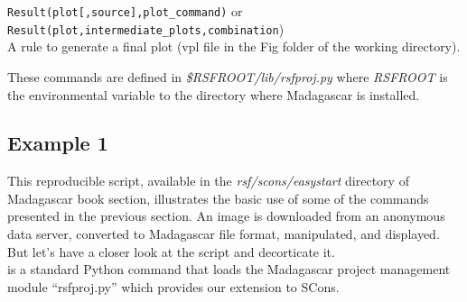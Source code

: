 \noindent\texttt{Result(plot[,source],plot\_command)} or\\ 
\texttt{Result(plot,intermediate\_plots,combination})\\
\indent A rule to generate a final plot (vpl file in the Fig folder of
the working directory).

These commands are defined in \textit{\$RSFROOT/lib/rsfproj.py} where
\textit{RSFROOT} is the environmental variable to the directory where
Madagascar is installed.

\subsection{Example 1}
%


This reproducible script, available in the
\textit{rsf/scons/easystart} directory of Madagascar book section,
illustrates the basic use of some of the commands presented in the
previous section. An image is downloaded from an anonymous data
server, converted to Madagascar file format, manipulated, and
displayed. But let's have a closer look at the script
and decorticate it.\\


%
is a standard Python command that loads the Madagascar project
management module ``rsfproj.py'' which provides our extension to
SCons.\\

